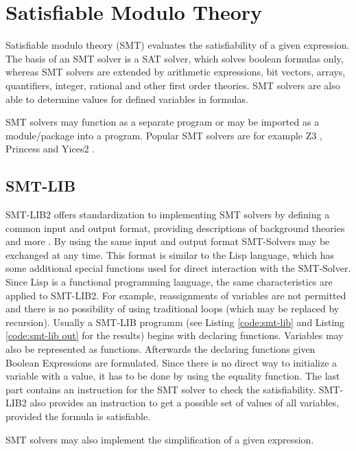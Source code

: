 \section{Satisfiable Modulo Theory}

Satisfiable modulo theory (SMT) evaluates the satisfiability of a given expression. 
The basis of an SMT solver is a SAT solver, which solves boolean formulas only, whereas SMT solvers are extended by arithmetic expressions, bit vectors, arrays, quantifiers, integer, rational and other first order theories. 
SMT solvers are also able to determine values for defined variables in formulas. 


SMT solvers may function as a separate program or may be imported as a module/package into a program. 
Popular SMT solvers are for example Z3 \cite{demouraZ3EfficientSMT2008}, Princess \cite{princess08} and Yices2 \cite{Dutertre:cav2014}.

\subsection{SMT-LIB}
SMT-LIB2 offers standardization to implementing SMT solvers by defining a common input and output format, providing descriptions of background theories and more \cite{cokSMTLIBv2LanguageTools}. %
By using the same input and output format SMT-Solvers may be exchanged at any time. 
This format is similar to the Lisp language, which has some additional special functions used for direct interaction with the SMT-Solver. Since Lisp is a functional programming language, the same characteristics are applied to SMT-LIB2.
For example, reassignments of variables are not permitted and there is no possibility of using traditional loops (which may be replaced by recursion).
Usually a SMT-LIB programm (see Listing \ref{code:smt-lib} and Listing \ref{code:smt-lib out} for the results) begins with declaring functions. Variables may also be represented as functions. 
Afterwards the declaring functions given Boolean Expressions are formulated. Since there is no direct way to initialize a variable with a value, it has to be done by using the equality function. 
The last part contains an instruction for the SMT solver to check the satisfiability. 
SMT-LIB2 also provides an instruction to get a possible set of values of all variables, provided the formula is satisfiable.

SMT solvers may also implement the simplification of a given expression.


